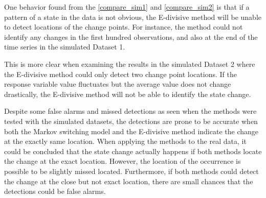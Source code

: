 One behavior found from the \ref{compare_sim1} and \ref{compare_sim2}
is that if a pattern of a state in the data is not obvious, the E-divisive
method will be unable to detect locations of the change points. For
instance, the method could not identify any changes in the first hundred
observations, and also at the end of the time series in the simulated
Dataset 1. %
\begin{comment}
Besides, the duration that time series stays in one state also affects
the ability of the E-divisive method to discover the change point
locations. In the simulated Dataset 2, many switches between states
occur over the time period. As a result, the period of staying in
each state is short. 
\end{comment}
{} This is more clear when examining the results in the simulated Dataset
2 where the E-divisive method could only detect two change point locations.
If the response variable value fluctuates but the average value does
not change drastically, the E-divisive method will not be able to
identify the state change. %
\begin{comment}
To illustrate, the switching pattern is considerably difficult to
notice in the simulated Dataset 2. The period of staying in the state
is short and there are many switches between states occur over the
period of time. The shift for the response variable is not dramatic
that one can see the huge difference when there is a switch in the
state. Therefore, the E-divisive method could only detect two change
point locations where the shifts were obvious. 
\end{comment}

Despite some false alarms and missed detections as seen when the methods
were tested with the simulated datasets, the detections are prone
to be accurate when both the Markov switching model and the E-divisive
method indicate the change at the exactly same location. When applying
the methods to the real data, it could be concluded that the state
change actually happens if both methods locate the change at the exact
location. However, the location of the occurrence is possible to be
slightly missed located. Furthermore, if both methods could detect
the change at the close but not exact location, there are small chances
that the detections could be false alarms. %
\begin{comment}
these two methods appear to discover changes at around the same location
that the actual changes occur. This suggests that for the real data,
where the actual state is unknown, the actual changes might occur
around locations which were detected by these two methods. Despite
some false alarms and missed detections as seen when testing methods
with the simulated datasets, when applying both the Markov switching
model and the E-divisive method the to the real data if these two
methods can identify the change point at the exact same location,
then there is a high probability the the change is an actual change
of the state.
\end{comment}

